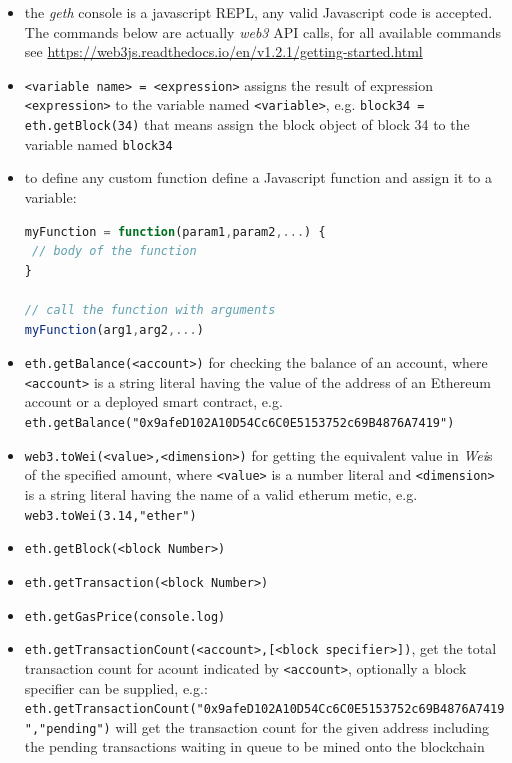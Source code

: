 \documentclass[a4paper]{article}
\begin{document}
\begin{itemize}
\item the \emph{geth} console is a javascript REPL, any valid Javascript code is accepted. The commands below are actually \emph{web3} API calls, for all available commands see \url{https://web3js.readthedocs.io/en/v1.2.1/getting-started.html}

\item \verb!<variable name> = <expression>! assigns the result of expression  \verb!<expression>! to the variable named \verb!<variable>!, e.g. \verb!block34 = eth.getBlock(34)! that means assign the block object of block 34 to the variable named \verb!block34!


\item to define any custom function define a Javascript function and assign it to a variable:

\begin{lstlisting}[language=javascript]
myFunction = function(param1,param2,...) {
 // body of the function
}

// call the function with arguments
myFunction(arg1,arg2,...)
\end{lstlisting}


\item \verb!eth.getBalance(<account>)! for checking the balance of an account, where \verb!<account>! is a string literal having the value of the address of an Ethereum account or a deployed smart contract, e.g. \verb!eth.getBalance("0x9afeD102A10D54Cc6C0E5153752c69B4876A7419")!

\item \verb!web3.toWei(<value>,<dimension>)! for getting the equivalent value in \emph{Wei}s of the specified amount, where \verb!<value>! is a number literal and \verb!<dimension>! is a string literal having the name of a valid etherum metic, e.g. \verb!web3.toWei(3.14,"ether")!

\item \verb!eth.getBlock(<block Number>)!

\item \verb!eth.getTransaction(<block Number>)!

\item \verb!eth.getGasPrice(console.log)!

\item \verb!eth.getTransactionCount(<account>,[<block specifier>])!, get the total transaction count for acount indicated by \verb!<account>!, optionally a block specifier can be supplied, e.g.: \\ \verb!eth.getTransactionCount("0x9afeD102A10D54Cc6C0E5153752c69B4876A7419","pending")! will get the transaction count for the given address including the pending transactions waiting in queue to be mined onto the blockchain


\end{itemize}
\end{document}
